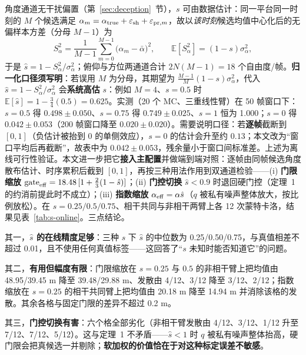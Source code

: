 \documentclass[UTF8,a4paper,zihao=-4]{ctexart}
\begin{document}
角度通道无干扰偏置（第~\ref{sec:deception}~节），\(s\) 可由数据估计：同一平台同一时刻的 \(M\) 个候选满足 \(\alpha_m=\alpha_{\rm true}+\varepsilon_{\rm sh}+\varepsilon_{{\rm pr},m}\)，故以\emph{该时刻}候选均值中心化后的无偏样本方差（分母 \(M-1\)）为
\begin{equation}
S_\alpha^2=\frac{1}{M-1}\sum_{m=0}^{M-1}\bigl(\alpha_m-\bar\alpha\bigr)^2,\qquad
\mathbb E[S_\alpha^2]=(1-s)\sigma_\alpha^2,
\label{eq:s-est}
\end{equation}
于是 \(\hat s=1-S_\alpha^2/\sigma_\alpha^2\)；俯仰与方位两通道合计 \(2N(M-1)=18\) 个自由度/帧。\textbf{归一化口径须写明}：若误用 \(M\) 为分母，其期望为 \(\frac{M-1}{M}(1-s)\sigma_\alpha^2\)，代入 \(\hat s=1-S_\alpha^2/\sigma_\alpha^2\) 会\textbf{系统高估} \(s\)：例如 \(M=4\)、\(s=0.5\) 时 \(\mathbb E[\hat s]=1-\frac34(0.5)=0.625\)。实测（20 个 MC、三重线性臂）在 50 帧窗口下：\(s=0.5\) 得 \(0.498\pm0.050\)、\(s=0.75\) 得 \(0.749\pm0.025\)、\(s=1\) 恒为 1.000；\(s=0\) 得 \(0.042\pm0.053\)（200 帧窗口降至 \(0.020\pm0.020\)）。需要说明口径：若\textbf{逐帧}截断到 \([0,1]\)（负估计被抬到 0 的单侧效应），\(s=0\) 的估计会升至约 \(0.13\)；本文改为“窗口平均后再截断”，故表中为 \(0.042\pm0.053\)，残余量小于窗口间标准差。上述为离线可行性验证。本文进一步把它\textbf{接入主配置}并做端到端对照：逐帧由同帧候选角度散布估计、时序累积后截到 \([0,1]\)，再按三种用法作用到双通道检验——(i) \textbf{门限缩放} \(\mathrm{gate}_{\rm eff}=18.48\,[1+\tfrac23(1-\hat s)]\)；(ii) \textbf{门控切换} \(\hat s<0.9\) 时退回硬门控（定理~1 的约消前提此时不成立）；(iii) \textbf{指数缩放} \(\alpha_{\rm eff}=\alpha\hat s\)（\(q\) 被私有噪声整体放大，按比例放松）。在 \(s=0.25/0.5/0.75\)、相干共同与非相干两臂上各 12 次蒙特卡洛，结果见表~\ref{tab:s-online}。三点结论。

其一，\textbf{\(\hat s\) 的在线精度足够}：三种 \(s\) 下 \(\hat s\) 的中位数为 0.25/0.50/0.75，与真值相差不超过 0.01，且不使用任何真值标签——这回答了“\(s\) 未知时能否知道它”的问题。

其二，\textbf{有用但幅度有限}：门限缩放在 \(s=0.25\) 与 \(0.5\) 的非相干臂上把均值由 48.95/39.45 m 降至 39.48/29.88 m、发散由 4/12、3/12 降至 3/12、2/12；指数缩放在 \(s=0.25\) 的相干共同臂上把均值由 20.18 m 降至 14.94 m 并消除该格的发散。其余各格与固定门限的差异不超过 0.2 m。

其三，\textbf{门控切换有害}：六个格全部劣化（非相干臂发散由 4/12、3/12、1/12 升至 7/12、7/12、5/12）。这与定理~1 不矛盾——\(\hat s<1\) 时 \(q\) 被私有噪声整体抬高，硬门限会把真候选一并剔除；\textbf{软加权的价值恰在于对这种标定误差不敏感}。
\end{document}
